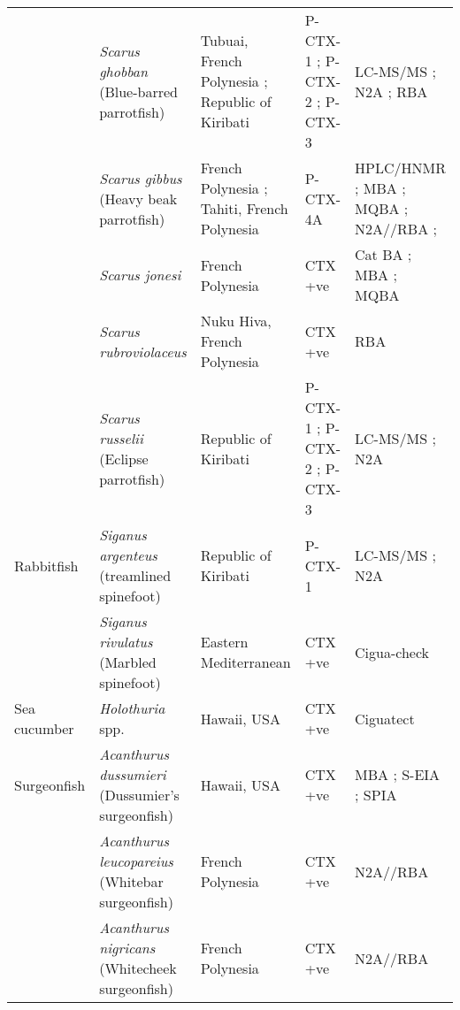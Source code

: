 \documentclass[12pt]{article}
\begin{document}
\begin{longtable}[l]{ | p{2cm} | p{3cm} | p{4.5cm} | p{2cm} | p{3cm} | }
	& \emph{Scarus ghobban} (Blue-barred parrotfish) & Tubuai, French Polynesia \cite{darius2007ciguatera}; Republic of Kiribati \cite{mak2013pacific} & P-CTX-1 \cite{mak2013pacific}; P-CTX-2 \cite{mak2013pacific}; P-CTX-3 \cite{mak2013pacific} & LC-MS/MS \cite{mak2013pacific}; N2A \cite{mak2013pacific}; RBA \cite{darius2007ciguatera} \\
	& \emph{Scarus gibbus} (Heavy beak parrotfish) & French Polynesia \cite{bagnis1987use,satake1996isolation,chinain2014mail}; Tahiti, French Polynesia \cite{pompon1983ciguatera} & P-CTX-4A \cite{satake1996isolation} & HPLC/HNMR \cite{satake1996isolation}; MBA \cite{bagnis1987use,satake1996isolation,pompon1983ciguatera}; MQBA \cite{bagnis1987use}; N2A//RBA \cite{chinain2014mail}; \\
	& \emph{Scarus jonesi} & French Polynesia \cite{bagnis1987use} & CTX +ve \cite{bagnis1987use} & Cat BA \cite{bagnis1987use}; MBA \cite{bagnis1987use}; MQBA \cite{bagnis1987use} \\
	& \emph{Scarus rubroviolaceus} & Nuku Hiva, French Polynesia \cite{darius2007ciguatera} & CTX +ve \cite{darius2007ciguatera} & RBA \cite{darius2007ciguatera}\\
	& \emph{Scarus russelii} (Eclipse parrotfish) & Republic of Kiribati \cite{mak2013pacific} & P-CTX-1 \cite{mak2013pacific}; P-CTX-2 \cite{mak2013pacific}; P-CTX-3 \cite{mak2013pacific} & LC-MS/MS \cite{mak2013pacific}; N2A \cite{mak2013pacific} \\
    \hline
	Rabbitfish & \emph{Siganus argenteus} (treamlined spinefoot) & Republic of Kiribati \cite{mak2013pacific} & P-CTX-1 \cite{mak2013pacific} & LC-MS/MS \cite{mak2013pacific}; N2A \cite{mak2013pacific} \\
	 & \emph{Siganus rivulatus} (Marbled spinefoot) & Eastern Mediterranean \cite{bentur2007ciguatoxin} & CTX +ve \cite{bentur2007ciguatoxin} & Cigua-check \textregistered \cite{bentur2007ciguatoxin}\\
	\hline
	Sea cucumber & \emph{Holothuria} spp. & Hawaii, USA \cite{park2000microbial} & CTX +ve \cite{park2000microbial} & Ciguatect \textregistered \cite{park2000microbial} \\
	\hline
	Surgeonfish &\emph{Acanthurus dussumieri} (Dussumier's surgeonfish) & Hawaii, USA \cite{hokama1993evaluation} & CTX +ve \cite{hokama1993evaluation} & MBA \cite{hokama1993evaluation}; S-EIA \cite{hokama1993evaluation}; SPIA \cite{hokama1993evaluation} \\
	& \emph{Acanthurus leucopareius} (Whitebar surgeonfish) & French Polynesia \cite{chinain2014mail} & CTX +ve \cite{chinain2014mail} & N2A//RBA \cite{chinain2014mail} \\ & \emph{Acanthurus nigricans} (Whitecheek surgeonfish) & French Polynesia \cite{chinain2014mail} & CTX +ve \cite{chinain2014mail} & N2A//RBA \cite{chinain2014mail} \\

\end{longtable}
\end{document}
